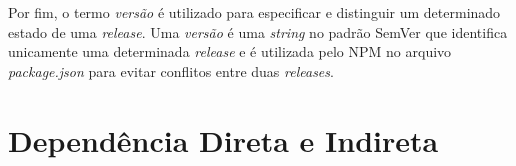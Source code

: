 Por fim, o termo \textit{versão} é utilizado para especificar e distinguir um determinado estado de uma \textit{release}. Uma \textit{versão} é uma \textit{string} no padrão \gls{SemVer} que identifica unicamente uma determinada \textit{release} e é utilizada pelo \gls{NPM} no arquivo \textit{package.json} para evitar conflitos entre duas \textit{releases}.

\section{Dependência Direta e Indireta}
\label{ref-teo:dep_di_ind}

